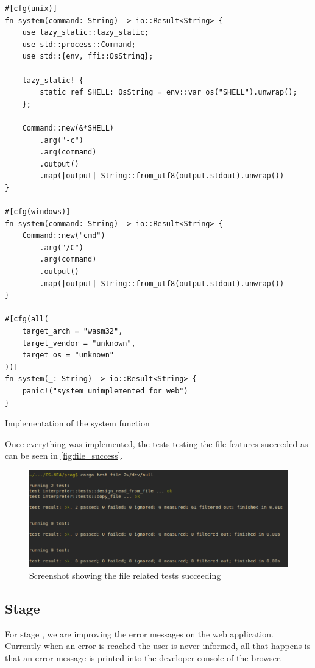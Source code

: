 \documentclass{article}
\newcommand{\subsecnum}{\the\value{subsection}}
\begin{document}
\begin{listing}
	\begin{verbatim}
#[cfg(unix)]
fn system(command: String) -> io::Result<String> {
    use lazy_static::lazy_static;
    use std::process::Command;
    use std::{env, ffi::OsString};

    lazy_static! {
        static ref SHELL: OsString = env::var_os("SHELL").unwrap();
    };

    Command::new(&*SHELL)
        .arg("-c")
        .arg(command)
        .output()
        .map(|output| String::from_utf8(output.stdout).unwrap())
}

#[cfg(windows)]
fn system(command: String) -> io::Result<String> {
    Command::new("cmd")
        .arg("/C")
        .arg(command)
        .output()
        .map(|output| String::from_utf8(output.stdout).unwrap())
}

#[cfg(all(
    target_arch = "wasm32",
    target_vendor = "unknown",
    target_os = "unknown"
))]
fn system(_: String) -> io::Result<String> {
    panic!("system unimplemented for web")
}
	\end{verbatim}
	\caption{Implementation of the system function}
	\label{lst:system}
\end{listing}

Once everything was implemented, the tests testing the file features succeeded
as can be seen in \autoref{fig:file_success}.

\begin{figure}
	\includegraphics[width=\textwidth]{file_success}
	\caption{Screenshot showing the file related tests succeeding}
	\label{fig:file_success}
\end{figure}

\subsection{Stage \subsecnum}

For stage \subsecnum, we are improving the error messages on the web application.
Currently when an error is reached the user is never informed, all that happens
is that an error message is printed into the developer console of the browser.
\end{document}

